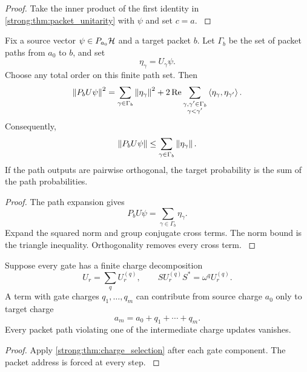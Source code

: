 \begin{proof}\label{strong:proof:014}
Take the inner product of the first identity in \cref{strong:thm:packet_unitarity} with \(\psi\) and set \(c=a\).
\label{strong:proof:014:end}\end{proof}

\begin{theorem}\label{strong:theorem:009}\label{strong:thm:path_interference}
Fix a source vector \(\psi\in P_{a_0}\Hcal\) and a target packet \(b\). Let \(\Gamma_b\) be the set of packet paths from \(a_0\) to \(b\), and set
\[
\eta_\gamma=U_\gamma\psi.
\]
Choose any total order on this finite path set. Then
\[
\left\lVert P_bU\psi\right\rVert^2
=
\sum_{\gamma\in\Gamma_b}\left\lVert\eta_\gamma\right\rVert^2
+
2\operatorname{Re}
\sum_{\substack{\gamma,\gamma'\in\Gamma_b\\ \gamma<\gamma'}}
\left\langle\eta_\gamma,\eta_{\gamma'}\right\rangle.
\]
Consequently,
\[
\left\lVert P_bU\psi\right\rVert
\leq
\sum_{\gamma\in\Gamma_b}\left\lVert\eta_\gamma\right\rVert.
\]
If the path outputs are pairwise orthogonal, the target probability is the sum of the path probabilities.
\end{theorem}

\begin{proof}\label{strong:proof:015}
The path expansion gives
\[
P_bU\psi=\sum_{\gamma\in\Gamma_b}\eta_\gamma.
\]
Expand the squared norm and group conjugate cross terms. The norm bound is the triangle inequality. Orthogonality removes every cross term.
\label{strong:proof:015:end}\end{proof}

\begin{proposition}\label{strong:proposition:002}\label{strong:prop:charge_pruning}
Suppose every gate has a finite charge decomposition
\[
U_r=\sum_qU_r^{(q)},
\qquad
SU_r^{(q)}S^*=\omega^qU_r^{(q)}.
\]
A term with gate charges \(q_1,\ldots,q_m\) can contribute from source charge \(a_0\) only to target charge
\[
a_m=a_0+q_1+\cdots+q_m.
\]
Every packet path violating one of the intermediate charge updates vanishes.
\end{proposition}

\begin{proof}\label{strong:proof:016}
Apply \cref{strong:thm:charge_selection} after each gate component. The packet address is forced at every step.
\label{strong:proof:016:end}\end{proof}

